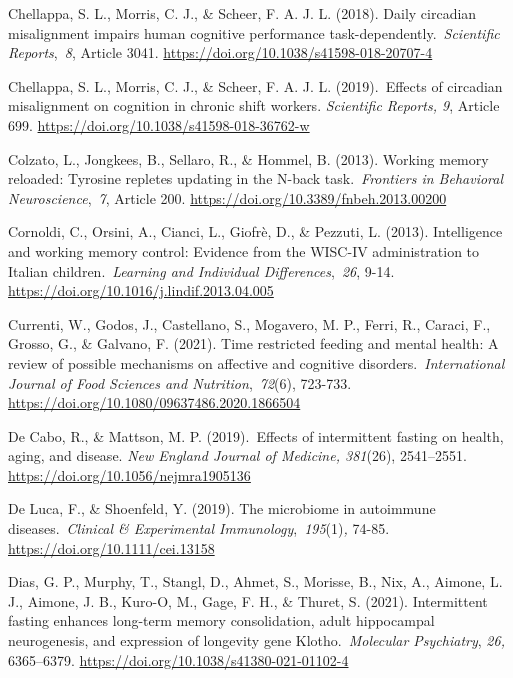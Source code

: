 \documentclass[authordate, empirical]{jote-new-article}
\begin{document}
Chellappa, S. L., Morris, C. J., \& Scheer, F. A. J. L. (2018). Daily circadian misalignment impairs human cognitive performance task-dependently. \emph{Scientific Reports}, \emph{8}, Article 3041. \url{https://doi.org/10.1038/s41598-018-20707-4}



Chellappa, S. L., Morris, C. J., \& Scheer, F. A. J. L. (2019). Effects of circadian misalignment on cognition in chronic shift workers.\emph{ Scientific Reports, 9}, Article 699. \url{https://doi.org/10.1038/s41598-018-36762-w}



Colzato, L., Jongkees, B., Sellaro, R., \& Hommel, B. (2013). Working memory reloaded: Tyrosine repletes updating in the N-back task. \emph{Frontiers in Behavioral Neuroscience}, \emph{7}, Article 200. \url{https://doi.org/10.3389/fnbeh.2013.00200}



Cornoldi, C., Orsini, A., Cianci, L., Giofrè, D., \& Pezzuti, L. (2013). Intelligence and working memory control: Evidence from the WISC-IV administration to Italian children. \emph{Learning and Individual Differences}, \emph{26}, 9-14. \url{https://doi.org/10.1016/j.lindif.2013.04.005}



Currenti, W., Godos, J., Castellano, S., Mogavero, M. P., Ferri, R., Caraci, F., Grosso, G., \& Galvano, F. (2021). Time restricted feeding and mental health: A review of possible mechanisms on affective and cognitive disorders. \emph{International Journal of Food Sciences and Nutrition}, \emph{72}(6), 723-733. \url{https://doi.org/10.1080/09637486.2020.1866504}



De Cabo, R., \& Mattson, M. P. (2019). Effects of intermittent fasting on health, aging, and disease.\emph{ New England Journal of Medicine, 381}(26), 2541--2551. \url{https://doi.org/10.1056/nejmra1905136}



De Luca, F., \& Shoenfeld, Y. (2019). The microbiome in autoimmune diseases. \emph{Clinical \& Experimental Immunology}, \emph{195}(1)\emph{,} 74-85. \url{https://doi.org/10.1111/cei.13158}



Dias, G. P., Murphy, T., Stangl, D., Ahmet, S., Morisse, B., Nix, A., Aimone, L. J., Aimone, J. B., Kuro-O, M., Gage, F. H., \& Thuret, S. (2021). Intermittent fasting enhances long-term memory consolidation, adult hippocampal neurogenesis, and expression of longevity gene Klotho. \emph{Molecular Psychiatry}, \emph{26,} 6365--6379. \url{https://doi.org/10.1038/s41380-021-01102-4}
\end{document}
